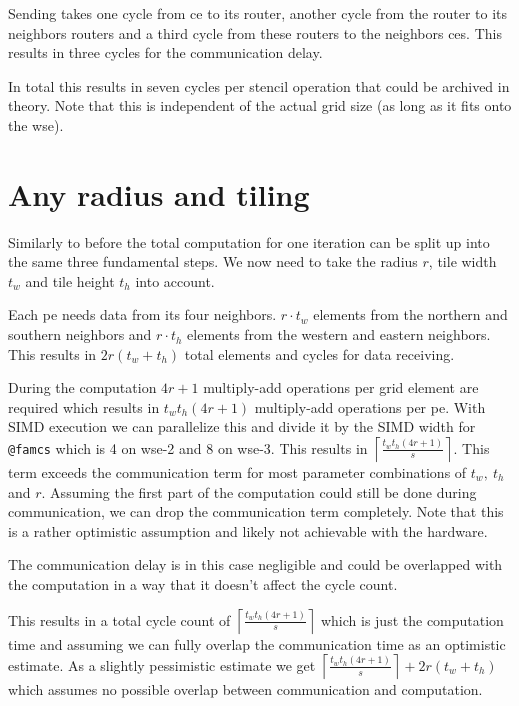 Sending takes one cycle from \ac{ce} to its router, another cycle from the router to its neighbors routers and a third cycle from these routers to the neighbors \acp{ce}. This results in three cycles for the communication delay.

In total this results in seven cycles per stencil operation that could be archived in theory.
Note that this is independent of the actual grid size (as long as it fits onto the \ac{wse}).

\section{Any radius and tiling}
Similarly to before the total computation for one iteration can be split up into the same three fundamental steps. We now need to take the radius $r$, tile width $t_w$ and tile height $t_h$ into account.

Each \ac{pe} needs data from its four neighbors. $r\cdot t_w$ elements from the northern and southern neighbors and $r\cdot t_h$ elements from the western and eastern neighbors. This results in $2r(t_w+t_h)$ total elements and cycles for data receiving.

During the computation $4r+1$ multiply-add operations per grid element are required which results in $t_wt_h(4r+1)$ multiply-add operations per \ac{pe}. With SIMD execution we can parallelize this and divide it by the SIMD width for \texttt{@famcs} which is 4 on wse-2 and 8 on wse-3. This results in $\left\lceil\frac{t_wt_h(4r+1)}{s}\right\rceil$. This term exceeds the communication term for most parameter combinations of $t_w,\ t_h$ and $r$. Assuming the first part of the computation could still be done during communication, we can drop the communication term completely. Note that this is a rather optimistic assumption and likely not achievable with the hardware.

The communication delay is in this case negligible and could be overlapped with the computation in a way that it doesn't affect the cycle count. 

This results in a total cycle count of $\left\lceil\frac{t_wt_h(4r+1)}{s}\right\rceil$ which is just the computation time and assuming we can fully overlap the communication time as an optimistic estimate. As a slightly pessimistic estimate we get $\left\lceil\frac{t_wt_h(4r+1)}{s}\right\rceil+2r(t_w+t_h)$ which assumes no possible overlap between communication and computation. 

